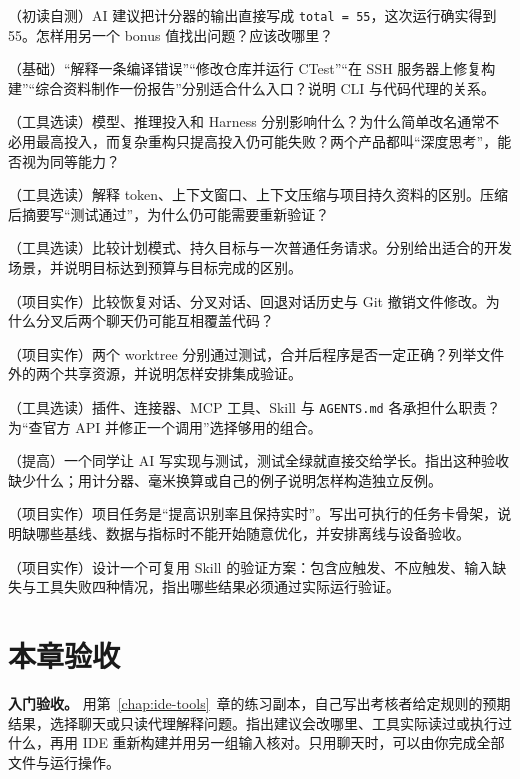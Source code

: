 \begin{problemset}
  \item\label{prob:v0-ai-first} （初读自测）AI 建议把计分器的输出直接写成 \texttt{total = 55}，这次运行确实得到 55。怎样用另一个 bonus 值找出问题？应该改哪里？
  \item\label{prob:v1-ai-1} （基础）“解释一条编译错误”“修改仓库并运行 CTest”“在 SSH 服务器上修复构建”“综合资料制作一份报告”分别适合什么入口？说明 CLI 与代码代理的关系。
  \item\label{prob:v1-ai-2} （工具选读）模型、推理投入和 Harness 分别影响什么？为什么简单改名通常不必用最高投入，而复杂重构只提高投入仍可能失败？两个产品都叫“深度思考”，能否视为同等能力？
  \item\label{prob:v1-ai-3} （工具选读）解释 token、上下文窗口、上下文压缩与项目持久资料的区别。压缩后摘要写“测试通过”，为什么仍可能需要重新验证？
  \item\label{prob:v1-ai-4} （工具选读）比较计划模式、持久目标与一次普通任务请求。分别给出适合的开发场景，并说明目标达到预算与目标完成的区别。
  \item\label{prob:v1-ai-5} （项目实作）比较恢复对话、分叉对话、回退对话历史与 Git 撤销文件修改。为什么分叉后两个聊天仍可能互相覆盖代码？
  \item\label{prob:v1-ai-6} （项目实作）两个 worktree 分别通过测试，合并后程序是否一定正确？列举文件外的两个共享资源，并说明怎样安排集成验证。
  \item\label{prob:v1-ai-7} （工具选读）插件、连接器、MCP 工具、Skill 与 \texttt{AGENTS.md} 各承担什么职责？为“查官方 API 并修正一个调用”选择够用的组合。
  \item\label{prob:v1-ai-8} （提高）一个同学让 AI 写实现与测试，测试全绿就直接交给学长。指出这种验收缺少什么；用计分器、毫米换算或自己的例子说明怎样构造独立反例。
  \item\label{prob:v1-ai-9} （项目实作）项目任务是“提高识别率且保持实时”。写出可执行的任务卡骨架，说明缺哪些基线、数据与指标时不能开始随意优化，并安排离线与设备验收。
  \item\label{prob:v1-ai-10} （项目实作）设计一个可复用 Skill 的验证方案：包含应触发、不应触发、输入缺失与工具失败四种情况，指出哪些结果必须通过实际运行验证。
\end{problemset}

\section{本章验收}
\label{sec:ai-acceptance}
\textbf{入门验收。} 用第~\ref{chap:ide-tools}~章的练习副本，自己写出考核者给定规则的预期结果，选择聊天或只读代理解释问题。指出建议会改哪里、工具实际读过或执行过什么，再用 IDE 重新构建并用另一组输入核对。只用聊天时，可以由你完成全部文件与运行操作。

